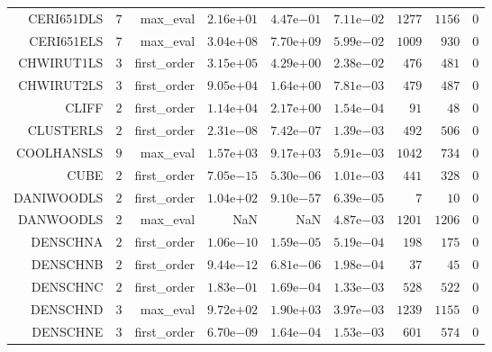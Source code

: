 \begin{longtable}{rrrrrrrrr}
CERI651DLS & \(     7\) & max\_eval & \( 2.16\)e\(+01\) & \( 4.47\)e\(-01\) & \( 7.11\)e\(-02\) & \(  1277\) & \(  1156\) & \(     0\) \\
CERI651ELS & \(     7\) & max\_eval & \( 3.04\)e\(+08\) & \( 7.70\)e\(+09\) & \( 5.99\)e\(-02\) & \(  1009\) & \(   930\) & \(     0\) \\
CHWIRUT1LS & \(     3\) & first\_order & \( 3.15\)e\(+05\) & \( 4.29\)e\(+00\) & \( 2.38\)e\(-02\) & \(   476\) & \(   481\) & \(     0\) \\
CHWIRUT2LS & \(     3\) & first\_order & \( 9.05\)e\(+04\) & \( 1.64\)e\(+00\) & \( 7.81\)e\(-03\) & \(   479\) & \(   487\) & \(     0\) \\
CLIFF & \(     2\) & first\_order & \( 1.14\)e\(+04\) & \( 2.17\)e\(+00\) & \( 1.54\)e\(-04\) & \(    91\) & \(    48\) & \(     0\) \\
CLUSTERLS & \(     2\) & first\_order & \( 2.31\)e\(-08\) & \( 7.42\)e\(-07\) & \( 1.39\)e\(-03\) & \(   492\) & \(   506\) & \(     0\) \\
COOLHANSLS & \(     9\) & max\_eval & \( 1.57\)e\(+03\) & \( 9.17\)e\(+03\) & \( 5.91\)e\(-03\) & \(  1042\) & \(   734\) & \(     0\) \\
CUBE & \(     2\) & first\_order & \( 7.05\)e\(-15\) & \( 5.30\)e\(-06\) & \( 1.01\)e\(-03\) & \(   441\) & \(   328\) & \(     0\) \\
DANIWOODLS & \(     2\) & first\_order & \( 1.04\)e\(+02\) & \( 9.10\)e\(-57\) & \( 6.39\)e\(-05\) & \(     7\) & \(    10\) & \(     0\) \\
DANWOODLS & \(     2\) & max\_eval &       NaN &       NaN & \( 4.87\)e\(-03\) & \(  1201\) & \(  1206\) & \(     0\) \\
DENSCHNA & \(     2\) & first\_order & \( 1.06\)e\(-10\) & \( 1.59\)e\(-05\) & \( 5.19\)e\(-04\) & \(   198\) & \(   175\) & \(     0\) \\
DENSCHNB & \(     2\) & first\_order & \( 9.44\)e\(-12\) & \( 6.81\)e\(-06\) & \( 1.98\)e\(-04\) & \(    37\) & \(    45\) & \(     0\) \\
DENSCHNC & \(     2\) & first\_order & \( 1.83\)e\(-01\) & \( 1.69\)e\(-04\) & \( 1.33\)e\(-03\) & \(   528\) & \(   522\) & \(     0\) \\
DENSCHND & \(     3\) & max\_eval & \( 9.72\)e\(+02\) & \( 1.90\)e\(+03\) & \( 3.97\)e\(-03\) & \(  1239\) & \(  1155\) & \(     0\) \\
DENSCHNE & \(     3\) & first\_order & \( 6.70\)e\(-09\) & \( 1.64\)e\(-04\) & \( 1.53\)e\(-03\) & \(   601\) & \(   574\) & \(     0\) \\

\end{longtable}

